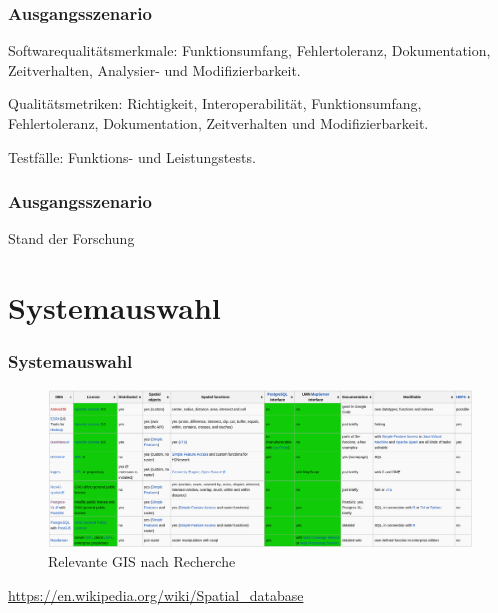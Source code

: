 \documentclass{beamer}
\begin{document}
\begin{frame}\frametitle{Ausgangsszenario}
\begin{block}{Softwarequalitätsmerkmale:}
Funktionsumfang, Fehlertoleranz, Dokumentation, Zeitverhalten, Analysier- und Modifizierbarkeit.
\end{block}

\vspace{\baselineskip}

\begin{block}{Qualitätsmetriken:}
Richtigkeit, Interoperabilität, Funktionsumfang, Fehlertoleranz, Dokumentation, Zeitverhalten und Modifizierbarkeit.
\end{block}

\vspace{\baselineskip}

\begin{block}{Testfälle:}
Funktions- und Leistungstests.
\end{block}
\end{frame}

\begin{frame}\frametitle{Ausgangsszenario}
Stand der Forschung


\end{frame}

\section{Systemauswahl}

\begin{frame}\frametitle{Systemauswahl}
\begin{figure}
\centering
\includegraphics[width=1\hsize]{spatial_databases.png}
\caption{Relevante GIS nach Recherche}
\end{figure}
\begin{center}
\tiny
\url{https://en.wikipedia.org/wiki/Spatial_database}
\end{center}
\end{frame}
\end{document}

